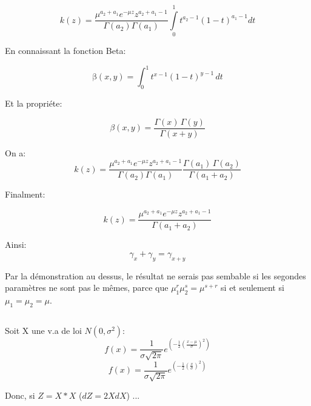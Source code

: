 \documentclass[a4paper]{article}
\begin{document}
\begin{equation}
k(z)=\frac{\mu^{a_2+a_1}e^{-\mu z}z^{a_2+a_1-1}}{\Gamma (a_2)\Gamma (a_1)}\int\limits_0^1{t^{a_2-1}}(1-t)^{a_1-1}dt
\end{equation}

En connaissant la fonction Beta:

\begin{equation}
\mathrm{\beta}(x,y) = \int_0^1t^{x-1}(1-t)^{y-1}\,dt
\end{equation}

Et la propriéte:

\begin{equation}
\beta(x,y)=\frac{\Gamma(x)\,\Gamma(y)}{\Gamma(x+y)}
\end{equation}


On a:
\begin{equation}
k(z)=\frac{\mu^{a_2+a_1}e^{-\mu z}z^{a_2+a_1-1}}{\Gamma (a_2)\Gamma (a_1)}\frac{\Gamma(a_1)\,\Gamma(a_2)}{\Gamma(a_1+a_2)}
\end{equation}

Finalment:

\begin{equation}
k(z)=\frac{\mu^{a_2+a_1}e^{-\mu z}z^{a_2+a_1-1}}{\Gamma(a_1+a_2)}
\end{equation}

Ainsi:
\begin{equation}
\gamma_{x}+\gamma_{y}=\gamma_{x+y}
\end{equation}

Par la démonstration au dessus, le résultat ne serais pas sembable si les segondes paramètres ne sont pas le mêmes, parce que 
$\mu_{1}^r \mu_{2}^s = \mu^{s+r}$ si et seulement si $\mu_1=\mu_2=\mu$.

\subsection{}

Soit X une v.a de loi $N(0,\sigma^2)$:
\begin{equation}
f(x)=\frac{1}{\sigma\sqrt{2\pi}}e^{(-\frac{1}{2}(\frac{x-\mu}{\sigma})^2)}
\end{equation}
\begin{equation}
f(x)=\frac{1}{\sigma\sqrt{2\pi}}e^{(-\frac{1}{2}(\frac{x}{\sigma})^2)}
\end{equation}

Donc, si $Z=X*X$ ($dZ=2XdX$) ...

\end{document}
